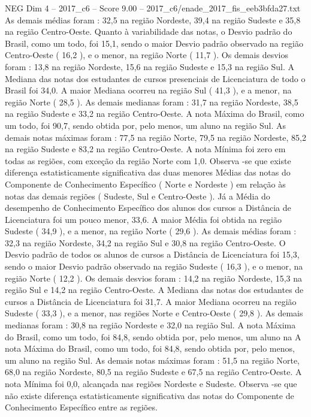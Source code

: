 \begin{textsample}{NEG Dim 4 – 2017\_c6 – Score 9.00 – 2017\_c6/enade\_2017\_fis\_eeb3bfda27.txt}
As demais médias foram : 32,5 na região Nordeste, 39,4 na região Sudeste e 35,8 na região Centro-Oeste.
Quanto à variabilidade das notas, o Desvio padrão do Brasil, como um todo, foi 15,1, sendo o maior Desvio padrão observado na região Centro-Oeste ( 16,2 ), e o menor, na região Norte ( 11,7 ).
Os demais desvios foram : 13,8 na região Nordeste, 15,6 na região Sudeste e 15,3 na região Sul.
A Mediana das notas dos estudantes de cursos presenciais de Licenciatura de todo o Brasil foi 34,0.
A maior Mediana ocorreu na região Sul ( 41,3 ), e a menor, na região Norte ( 28,5 ).
As demais medianas foram : 31,7 na região Nordeste, 38,5 na região Sudeste e 33,2 na região Centro-Oeste.
A nota Máxima do Brasil, como um todo, foi 90,7, sendo obtida por, pelo menos, um aluno na região Sul.
As demais notas máximas foram : 77,5 na região Norte, 79,5 na região Nordeste, 85,2 na região Sudeste e 83,2 na região Centro-Oeste.
A nota Mínima foi zero em todas as regiões, com exceção da região Norte com 1,0.
Observa -se que existe diferença estatisticamente significativa das duas menores Médias das notas do Componente de Conhecimento Específico ( Norte e Nordeste ) em relação às notas das demais regiões ( Sudeste, Sul e Centro-Oeste ).
Já a Média do desempenho de Conhecimento Específico dos alunos dos cursos a Distância de Licenciatura foi um pouco menor, 33,6.
A maior Média foi obtida na região Sudeste ( 34,9 ), e a menor, na região Norte ( 29,6 ).
As demais médias foram : 32,3 na região Nordeste, 34,2 na região Sul e 30,8 na região Centro-Oeste.
O Desvio padrão de todos os alunos de cursos a Distância de Licenciatura foi 15,3, sendo o maior Desvio padrão observado na região Sudeste ( 16,3 ), e o menor, na região Norte ( 12,2 ).
Os demais desvios foram : 14,2 na região Nordeste, 15,3 na região Sul e 14,2 na região Centro-Oeste.
A Mediana das notas dos estudantes de cursos a Distância de Licenciatura foi 31,7.
A maior Mediana ocorreu na região Sudeste ( 33,3 ), e a menor, nas regiões Norte e Centro-Oeste ( 29,8 ).
As demais medianas foram : 30,8 na região Nordeste e 32,0 na região Sul.
A nota Máxima do Brasil, como um todo, foi 84,8, sendo obtida por, pelo menos, um aluno na A nota Máxima do Brasil, como um todo, foi 84,8, sendo obtida por, pelo menos, um aluno na região Sul.
As demais notas máximas foram : 51,5 na região Norte, 68,0 na região Nordeste, 80,5 na região Sudeste e 67,5 na região Centro-Oeste.
A nota Mínima foi 0,0, alcançada nas regiões Nordeste e Sudeste.
Observa -se que não existe diferença estatisticamente significativa das notas do Componente de Conhecimento Específico entre as regiões.

\end{textsample}
